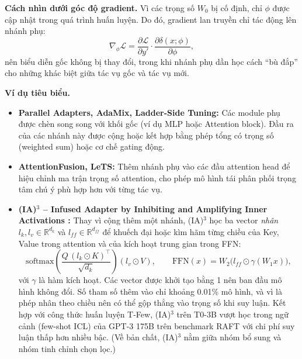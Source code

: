 \textbf{Cách nhìn dưới góc độ gradient.}  
Vì các trọng số $W_0$ bị cố định, chỉ $\phi$ được cập nhật trong quá trình huấn luyện. Do đó, gradient lan truyền chỉ tác động lên nhánh phụ:
\[
\nabla_\phi \mathcal{L} = \frac{\partial \mathcal{L}}{\partial y'} \cdot \frac{\partial \delta(x; \phi)}{\partial \phi},
\]
nên biểu diễn gốc không bị thay đổi, trong khi nhánh phụ dần học cách “bù đắp” cho những khác biệt giữa tác vụ gốc và tác vụ mới.

\textbf{Ví dụ tiêu biểu.}
\begin{itemize}
	\item \textbf{Parallel Adapters\cite{pfeiffer2021adapterfusion}, AdaMix\cite{chen2022adamixture}, Ladder-Side Tuning\cite{he2021laddersidetuning}:}  
	Các module phụ được chèn song song với khối gốc (ví dụ MLP hoặc Attention block). Đầu ra của các nhánh này được cộng hoặc kết hợp bằng phép tổng có trọng số (weighted sum) hoặc cơ chế gating động.
	\item \textbf{AttentionFusion, LeTS\cite{he2022towards}:}  
	Thêm nhánh phụ vào các đầu attention head để hiệu chỉnh ma trận trọng số attention, cho phép mô hình tái phân phối trọng tâm chú ý phù hợp hơn với từng tác vụ.
	\item \textbf{(IA)$^3$ -- Infused Adapter by Inhibiting and Amplifying Inner Activations \cite{liu2022ia3}:}
	Thay vì cộng thêm một nhánh, (IA)$^3$ học ba vector \emph{nhân} $l_k, l_v \in \mathbb{R}^{d_k}$ và $l_{ff} \in \mathbb{R}^{d_{ff}}$ để khuếch đại hoặc kìm hãm từng chiều của Key, Value trong attention và của kích hoạt trung gian trong FFN:
	\[
	\text{softmax}\!\left(\frac{Q\,(l_k \odot K)^\top}{\sqrt{d_k}}\right)(l_v \odot V), \qquad
	\text{FFN}(x) = W_2\big(l_{ff} \odot \gamma(W_1 x)\big),
	\]
	với $\gamma$ là hàm kích hoạt. Các vector được khởi tạo bằng 1 nên ban đầu mô hình không đổi. Số tham số thêm vào chỉ khoảng 0.01\% mô hình, và vì là phép nhân theo chiều nên có thể gộp thẳng vào trọng số khi suy luận. Kết hợp với công thức huấn luyện T-Few, (IA)$^3$ trên T0-3B vượt học trong ngữ cảnh (few-shot ICL) của GPT-3 175B trên benchmark RAFT với chi phí suy luận thấp hơn nhiều bậc. (Về bản chất, (IA)$^3$ nằm giữa nhóm bổ sung và nhóm tinh chỉnh chọn lọc.)
\end{itemize}

